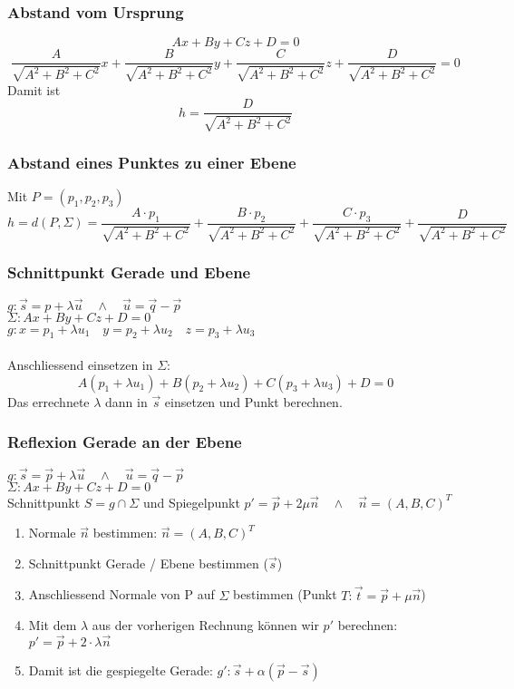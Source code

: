 \documentclass{report}
\begin{document}
\subsubsection{Abstand vom Ursprung}
\begin{equation}Ax + By + Cz + D = 0\end{equation}
\begin{equation}\frac{A}{\sqrt{A^2+B^2+C^2}}x+\frac{B}{\sqrt{A^2+B^2+C^2}}y + \frac{C}{\sqrt{A^2+B^2+C^2}}z + \frac{D}{\sqrt{A^2+B^2+C^2}} = 0\end{equation}
Damit ist
\begin{equation}h = \frac{D}{\sqrt{A^2+B^2+C^2}}\end{equation}
\subsubsection{Abstand eines Punktes zu einer Ebene}
Mit $P = (p_1, p_2, p_3)$
\begin{equation}h = d(P, \Sigma) = \frac{A \cdot p_1}{\sqrt{A^2+B^2+C^2}} + \frac{B \cdot p_2}{\sqrt{A^2+B^2+C^2}} + \frac{C \cdot p_3}{\sqrt{A^2+B^2+C^2}} + \frac{D}{\sqrt{A^2+B^2+C^2}}\end{equation}
\subsubsection{Schnittpunkt Gerade und Ebene}
$g: \vec{s} = p + \lambda \vec{u} \quad \land \quad \vec{u} = \vec{q} - \vec{p}$\\
$\Sigma: Ax+By+Cz+D=0$\\
$g: x = p_1+\lambda u_1 \quad y=p_2+\lambda u_2 \quad z = p_3 + \lambda u_3$\\\\
Anschliessend einsetzen in $\Sigma$:
\begin{equation}A(p_1+\lambda u_1) + B(p_2+\lambda u_2) + C(p_3+\lambda u_3) + D = 0\end{equation}
Das errechnete $\lambda$ dann in $\vec{s}$ einsetzen und Punkt berechnen.
\subsubsection{Reflexion Gerade an der Ebene}
$g: \vec{s} = \vec{p} + \lambda \vec{u} \quad \land \quad \vec{u} = \vec{q} - \vec{p}$\\
$\Sigma: Ax + By + Cz + D = 0$\\
Schnittpunkt $S = g \cap \Sigma$ und Spiegelpunkt $p' = \vec{p} + 2 \mu \vec{n} \quad \land \quad \vec{n} = (A,B,C)^T$
\begin{enumerate}
\item Normale $\vec{n}$ bestimmen: $\vec{n} = (A,B,C)^T$
\item Schnittpunkt Gerade / Ebene bestimmen ($\vec{s}$)
\item Anschliessend Normale von P auf $\Sigma$ bestimmen (Punkt $T: \vec{t} = \vec{p}+ \mu \vec{n}$)
\item Mit dem $\lambda$ aus der vorherigen Rechnung können wir $p'$ berechnen: $p' = \vec{p} + 2 \cdot \lambda \vec{n}$
\item Damit ist die gespiegelte Gerade: $g': \vec{s} + \alpha (\vec{p} - \vec{s})$
\end{enumerate}
\end{document}
